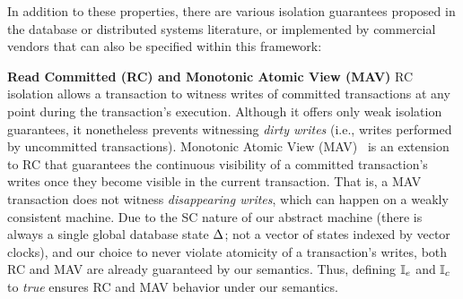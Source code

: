In addition to these properties, there are various isolation
guarantees proposed in the database or distributed systems literature,
or implemented by commercial vendors that can also be specified within
this framework:

\textbf{Read Committed (RC) and Monotonic Atomic View (MAV)} RC
isolation allows a transaction to witness writes of committed
transactions at any point during the transaction's execution.
Although it offers only weak isolation guarantees, it nonetheless
prevents witnessing \emph{dirty writes} (i.e., writes performed by
uncommitted transactions).  Monotonic Atomic View
(MAV)~\cite{bailishat} is an extension to RC that guarantees the
continuous visibility of a committed transaction's writes once they
become visible in the current transaction. That is, a MAV transaction
does not witness \emph{disappearing writes}, which can happen on a
weakly consistent machine. Due to the SC nature of our abstract
machine (there is always a single global database state $\Delta$; not a
vector of states indexed by vector clocks), and our choice to never
violate atomicity of a transaction's writes, both RC and MAV are
already guaranteed by our semantics.  Thus, defining $\mathbb{I}_e$ and $\mathbb{I}_c$
to \emph{true} ensures RC and MAV behavior under our semantics.

